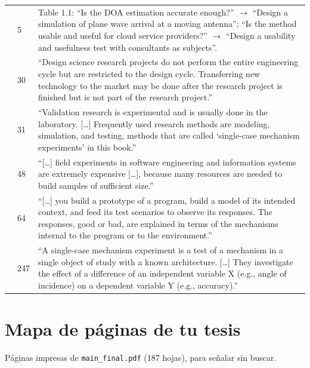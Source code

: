 \documentclass[11pt,a4paper]{article}
\begin{document}
{\begin{longtable}{@{}L{2.4cm}L{1.2cm}L{12.2cm}@{}}
 & 5 & Table 1.1: “Is the DOA estimation accurate enough?” $\to$ “Design a simulation of plane wave arrival at a moving antenna”; “Is the method usable and useful for cloud service providers?” $\to$ “Design a usability and usefulness test with consultants as subjects”.\\
 & 30 & “Design science research projects do not perform the entire engineering cycle but are restricted to the design cycle. Transferring new technology to the market may be done after the research project is finished but is not part of the research project.”\\
 & 31 & “Validation research is experimental and is usually done in the laboratory. [\ldots] Frequently used research methods are modeling, simulation, and testing, methods that are called ‘single-case mechanism experiments’ in this book.”\\
 & 48 & “[\ldots] field experiments in software engineering and information systems are extremely expensive [\ldots], because many resources are needed to build samples of sufficient size.”\\
 & 64 & “[\ldots] you build a prototype of a program, build a model of its intended context, and feed its test scenarios to observe its responses. The responses, good or bad, are explained in terms of the mechanisms internal to the program or to the environment.”\\
 & 247 & “A single-case mechanism experiment is a test of a mechanism in a single object of study with a known architecture. [\ldots] They investigate the effect of a difference of an independent variable X (e.g., angle of incidence) on a dependent variable Y (e.g., accuracy).”\\
\end{longtable}}

\section{Mapa de páginas de tu tesis}\label{anx:paginas}

Páginas impresas de \texttt{main\_final.pdf} (187 hojas), para señalar sin buscar.
\end{document}
